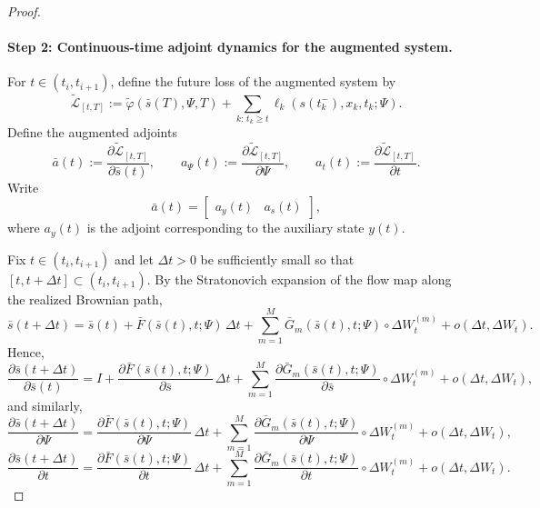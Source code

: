 \documentclass[11pt]{article}
\theoremstyle{definition}
\numberwithin{equation}{section}
\numberwithin{theorem}{section}
\numberwithin{proposition}{section}
\numberwithin{lemma}{section}
\numberwithin{corollary}{section}
\numberwithin{definition}{section}
\numberwithin{remark}{section}
\newcommand{\1}{\mathbbm{1}}
\begin{document}
\begin{proof}
\paragraph{Step 2: Continuous-time adjoint dynamics for the augmented system.}
For $t\in(t_i,t_{i+1})$, define the future loss of the augmented system by
\begin{equation}
\label{eq:app_augmented_future_loss}
\tilde{\mathcal L}_{[t,T]}
:=
\tilde \varphi(\bar s(T),\Psi,T)
+
\sum_{k:\,t_k\ge t}\ell_k(s(t_k^-),x_k,t_k;\Psi).
\end{equation}
Define the augmented adjoints
\begin{equation}
\label{eq:app_augmented_adjoint_defs}
\bar a(t):=\frac{\partial \tilde{\mathcal L}_{[t,T]}}{\partial \bar s(t)},
\qquad
a_\Psi(t):=\frac{\partial \tilde{\mathcal L}_{[t,T]}}{\partial \Psi},
\qquad
a_t(t):=\frac{\partial \tilde{\mathcal L}_{[t,T]}}{\partial t}.
\end{equation}
Write
\[
\bar a(t)=\begin{bmatrix} a_y(t) & a_s(t)\end{bmatrix},
\]
where $a_y(t)$ is the adjoint corresponding to the auxiliary state $y(t)$.

Fix $t\in(t_i,t_{i+1})$ and let $\Delta t>0$ be sufficiently small so that $[t,t+\Delta t]\subset(t_i,t_{i+1})$. By the Stratonovich expansion of the flow map along the realized Brownian path,
\begin{equation}
\label{eq:app_augmented_small_step}
\bar s(t+\Delta t)
=
\bar s(t)
+
\bar F(\bar s(t),t;\Psi)\,\Delta t
+
\sum_{m=1}^M \bar G_m(\bar s(t),t;\Psi)\circ \Delta W_t^{(m)}
+
o(\Delta t,\Delta W_t).
\end{equation}
Hence,
\begin{equation}
\label{eq:app_augmented_jacobian_state}
\frac{\partial \bar s(t+\Delta t)}{\partial \bar s(t)}
=
I
+
\frac{\partial \bar F(\bar s(t),t;\Psi)}{\partial \bar s}\,\Delta t
+
\sum_{m=1}^M
\frac{\partial \bar G_m(\bar s(t),t;\Psi)}{\partial \bar s}\circ \Delta W_t^{(m)}
+
o(\Delta t,\Delta W_t),
\end{equation}
and similarly,
\begin{equation}
\label{eq:app_augmented_jacobian_param}
\frac{\partial \bar s(t+\Delta t)}{\partial \Psi}
=
\frac{\partial \bar F(\bar s(t),t;\Psi)}{\partial \Psi}\,\Delta t
+
\sum_{m=1}^M
\frac{\partial \bar G_m(\bar s(t),t;\Psi)}{\partial \Psi}\circ \Delta W_t^{(m)}
+
o(\Delta t,\Delta W_t),
\end{equation}
\begin{equation}
\label{eq:app_augmented_jacobian_time}
\frac{\partial \bar s(t+\Delta t)}{\partial t}
=
\frac{\partial \bar F(\bar s(t),t;\Psi)}{\partial t}\,\Delta t
+
\sum_{m=1}^M
\frac{\partial \bar G_m(\bar s(t),t;\Psi)}{\partial t}\circ \Delta W_t^{(m)}
+
o(\Delta t,\Delta W_t).
\end{equation}


\end{proof}
\end{document}
